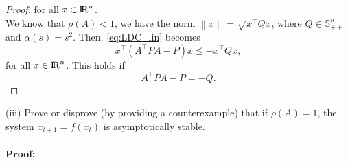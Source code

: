 \documentclass[a4paper,11pt,reqno]{amsart}
\newcommand{\R}{{\rm I\!R}}
\newcommand{\tran}{\intercal}
\newcommand{\smallplus}{{\scriptscriptstyle +}}
\newcommand{\Spp}{\mathbb{S}_{\smallplus\smallplus}}
\begin{document}
\begin{proof}
for all $x\in\R^n$.\\
We know that $\rho(A)<1$, we have the norm $\left\lVert x\right\rVert=\sqrt{x^{\tran}Qx}$, where $Q\in\Spp^n$ and $\alpha(s)=s^2$. Then, \eqref{eq:LDC_lin} becomes
\begin{equation}
    x^{\tran}(A^{\tran}PA-P)x\leq -x^{\tran}Qx,
\end{equation}
for all $x\in\R^n$. This holds if
\begin{equation}
    A^{\tran}PA-P=-Q.
\end{equation}
\end{proof}
(iii) Prove or disprove (by providing a counterexample) that if $\rho(A)=1$, the system $x_{t+1}=f(x_t)$ is asymptotically stable.
\\ \\
\textbf{Proof:} 
\\ \\
\end{document}
